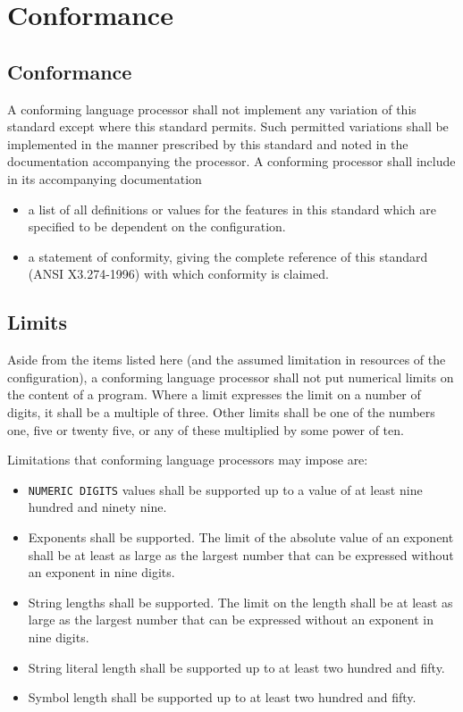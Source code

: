 \chapter{Conformance}\label{conformance}

\section{Conformance}\label{conformance-1}

A conforming language processor shall not implement any variation of
this standard except where this standard permits. Such permitted
variations shall be implemented in the manner prescribed by this
standard and noted in the documentation accompanying the processor. A
conforming processor shall include in its accompanying documentation

\begin{itemize}
\item
  a list of all definitions or values for the features in this standard
  which are specified to be dependent on the configuration.
\item
  a statement of conformity, giving the complete reference of this
  standard (ANSI X3.274-1996) with which conformity is claimed.
\end{itemize}

\section{Limits}\label{limits}

Aside from the items listed here (and the assumed limitation in
resources of the configuration), a conforming language processor shall
not put numerical limits on the content of a program. Where a limit
expresses the limit on a number of digits, it shall be a multiple of
three. Other limits shall be one of the numbers one, five or twenty
five, or any of these multiplied by some power of ten.

Limitations that conforming language processors may impose are:

\begin{itemize}
\item
  \texttt{NUMERIC\ DIGITS} values shall be supported up to a value of at
  least nine hundred and ninety nine.
\item
  Exponents shall be supported. The limit of the absolute value of an
  exponent shall be at least as large as the largest number that can be
  expressed without an exponent in nine digits.
\item
  String lengths shall be supported. The limit on the length shall be at
  least as large as the largest number that can be expressed without an
  exponent in nine digits.
\item
  String literal length shall be supported up to at least two hundred
  and fifty.
\item
  Symbol length shall be supported up to at least two hundred and fifty.
\end{itemize}
